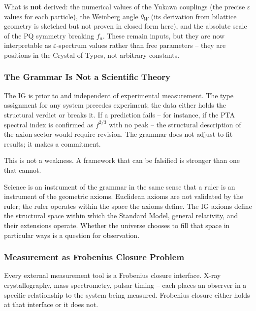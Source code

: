 What is \textbf{not} derived: the numerical values of the Yukawa
couplings (the precise \(\varepsilon\) values for each particle), the
Weinberg angle \(\theta_W\) (its derivation from bilattice geometry is
sketched but not proven in closed form here), and the absolute scale of
the PQ symmetry breaking \(f_a\). These remain inputs, but they are now
interpretable as \(\varepsilon\)-spectrum values rather than free
parameters -- they are positions in the Crystal of Types, not arbitrary
constants.

\hypertarget{the-grammar-is-not-a-scientific-theory}{%
\subsubsection{The Grammar Is Not a Scientific
Theory}\label{the-grammar-is-not-a-scientific-theory}}

The IG is prior to and independent of experimental measurement. The type
assignment for any system precedes experiment; the data either holds the
structural verdict or breaks it. If a prediction fails -- for instance,
if the PTA spectral index is confirmed as \(f^{2/3}\) with no peak --
the structural description of the axion sector would require revision.
The grammar does not adjust to fit results; it makes a commitment.

This is not a weakness. A framework that can be falsified is stronger
than one that cannot.

Science is an instrument of the grammar in the same sense that a ruler
is an instrument of the geometric axioms. Euclidean axioms are not
validated by the ruler; the ruler operates within the space the axioms
define. The IG axioms define the structural space within which the
Standard Model, general relativity, and their extensions operate.
Whether the universe chooses to fill that space in particular ways is a
question for observation.

\hypertarget{measurement-as-frobenius-closure-problem}{%
\subsubsection{Measurement as Frobenius Closure
Problem}\label{measurement-as-frobenius-closure-problem}}

Every external measurement tool is a Frobenius closure interface. X-ray
crystallography, mass spectrometry, pulsar timing -- each places an
observer in a specific relationship to the system being measured.
Frobenius closure either holds at that interface or it does not.

